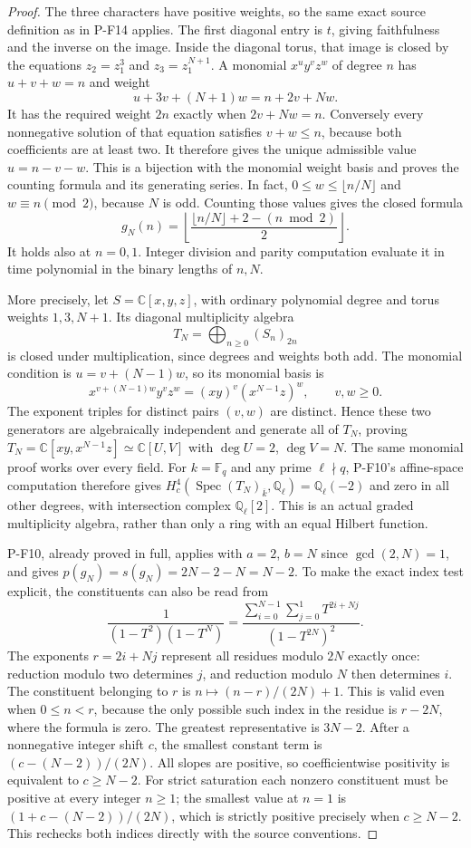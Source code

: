 \documentclass[11pt,a4paper]{article}
\begin{document}
\begin{proof}
The three characters have positive weights, so the same exact source
definition as in P-F14 applies. The first diagonal entry is $t$,
giving faithfulness and the inverse on the image. Inside the diagonal
torus, that image is closed by the equations
$z_2=z_1^3$ and $z_3=z_1^{N+1}$.
A monomial $x^u y^v z^w$ of degree $n$ has $u+v+w=n$ and weight
\[
 u+3v+(N+1)w=n+2v+Nw.
\]
It has the required weight $2n$ exactly when $2v+Nw=n$.
Conversely every nonnegative solution of that equation satisfies
$v+w\le n$, because both coefficients are at least two.
It therefore gives the unique admissible value $u=n-v-w$.
This is a bijection with the monomial weight basis and proves the
counting formula and its generating series.
In fact, $0\le w\le\lfloor n/N\rfloor$ and
$w\equiv n\pmod2$, because $N$ is odd. Counting those values gives
the closed formula
\[
 g_N(n)=\left\lfloor
 \frac{\lfloor n/N\rfloor+2-(n\bmod2)}2
 \right\rfloor.
\]
It holds also at $n=0,1$. Integer division and parity computation
evaluate it in time polynomial in the binary lengths of $n,N$.

More precisely, let $S=\mathbb C[x,y,z]$, with ordinary polynomial
degree and torus weights $1,3,N+1$. Its diagonal multiplicity algebra
\[
 T_N=\bigoplus_{n\ge0}(S_n)_{2n}
\]
is closed under multiplication, since degrees and weights both add.
The monomial condition is $u=v+(N-1)w$, so its monomial basis is
\[
 x^{v+(N-1)w}y^v z^w=(xy)^v(x^{N-1}z)^w,
 \qquad v,w\ge0.
\]
The exponent triples for distinct pairs $(v,w)$ are distinct.
Hence these two generators are algebraically independent and generate
all of $T_N$, proving
$T_N=\mathbb C[xy,x^{N-1}z]\simeq\mathbb C[U,V]$ with
$\deg U=2$, $\deg V=N$. The same monomial proof works over every
field. For $k=\mathbb F_q$ and any prime $\ell\nmid q$, P-F10's
affine-space computation therefore gives
$H_c^4(\operatorname{Spec}(T_N)_{\overline k},\mathbb Q_\ell)
=\mathbb Q_\ell(-2)$ and zero in all other degrees, with intersection
complex $\mathbb Q_\ell[2]$. This is an actual graded multiplicity
algebra, rather than only a ring with an equal Hilbert function.

P-F10, already proved in full, applies with $a=2$, $b=N$ since
$\gcd(2,N)=1$, and gives
$p(g_N)=s(g_N)=2N-2-N=N-2$. To make the exact index test explicit,
the constituents can also be read from
\[
 \frac1{(1-T^2)(1-T^N)}
 =\frac{\displaystyle\sum_{i=0}^{N-1}\sum_{j=0}^{1}T^{2i+Nj}}
 {(1-T^{2N})^2}.
\]
The exponents $r=2i+Nj$ represent all residues modulo $2N$ exactly
once: reduction modulo two determines $j$, and reduction modulo $N$
then determines $i$. The constituent belonging to $r$ is
$n\mapsto (n-r)/(2N)+1$. This is valid even when $0\le n<r$,
because the only possible such index in the residue is $r-2N$,
where the formula is zero. The greatest representative is $3N-2$.
After a nonnegative integer shift $c$, the smallest constant term
is $(c-(N-2))/(2N)$. All slopes are positive, so coefficientwise
positivity is equivalent to $c\ge N-2$. For strict saturation
each nonzero constituent must be positive at every integer $n\ge1$;
the smallest value at $n=1$ is $(1+c-(N-2))/(2N)$, which is
strictly positive precisely when $c\ge N-2$. This rechecks both
indices directly with the source conventions.


\end{proof}
\end{document}
